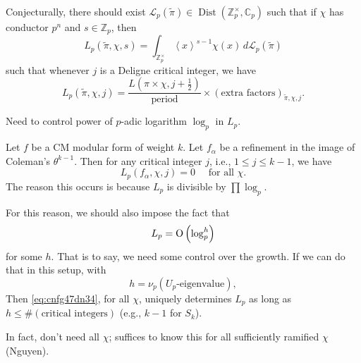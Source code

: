 \documentclass[reqno]{amsart} 
\begin{document}
Conjecturally, there should exist $\mathcal{L}_p(\tilde{\pi}) \in \operatorname{Dist}(\mathbb{Z}_p^\times, \mathbb{C}_p)$ such that if $\chi$ has conductor $p^n$ and $s \in \mathbb{Z}_p$, then
\begin{equation*}
  L_p(\tilde{\pi}, \chi, s) = \int_{\mathbb{Z}_p^\times}
  \left\langle x \right\rangle^{s - 1} \chi(x) \, d \mathcal{L}_p(\tilde{\pi})
\end{equation*}
such that whenever $j$ is a Deligne critical integer, we have
\begin{equation}\label{eq:cnfg47dn34}
  L_p(\tilde{\pi}, \chi, j) = \frac{L(\pi \times \chi, j + \tfrac{1}{2})}{\mathrm{period}}
  \times(\text{extra factors})_{\tilde{\pi}, \chi, j}.
\end{equation}
\begin{remark}\label{remark:cnfg5j6990}
  Need to control power of $p$-adic logarithm $\log_p$ in $L_p$.
\end{remark}
\begin{example}\label{example:cnfg5j7bim}
  Let $f$ be a CM modular form of weight $k$.  Let $f_\alpha$ be a refinement in the image of Coleman's $\theta^{k - 1}$.  Then for any critical integer $j$, i.e., $1 \leq j \leq k - 1$, we have
  \begin{equation*}
    L_p(f_\alpha, \chi, j) = 0 \quad \text{ for all } \chi.
  \end{equation*}
  The reason this occurs is because $L_p$ is divisible by $\prod \log_p$.
\end{example}
For this reason, we should also impose the fact that
\begin{equation*}
  L_p = \operatorname{O} \left( \log_p^h \right)
\end{equation*}
for some $h$.  That is to say, we need some control over the growth.  If we can do that in this setup, with
\begin{equation*}
  h = \nu_p \left( U_p \text{-eigenvalue} \right),
\end{equation*}
Then \eqref{eq:cnfg47dn34}, for all $\chi$, uniquely determines $L_p$ as long as $h \leq \# (\text{critical integers})$ (e.g., $k - 1$ for $S_k$).

In fact, don't need all $\chi$; suffices to know this for all sufficiently ramified $\chi$ (Nguyen).
\end{document}
